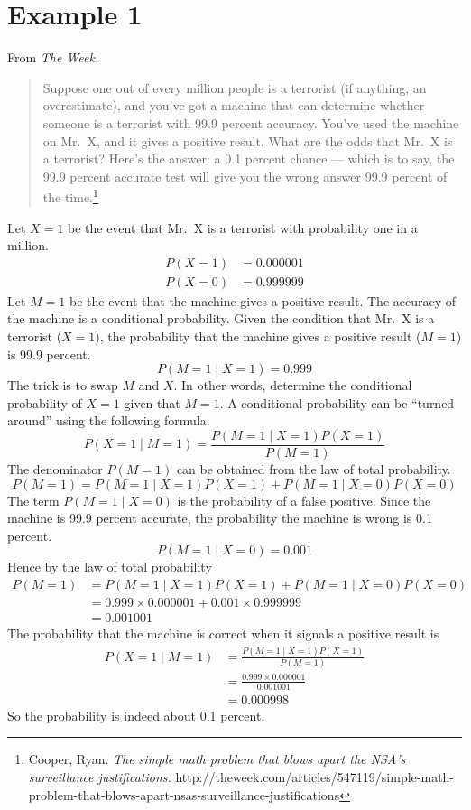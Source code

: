 \documentclass[12pt]{article}
\begin{document}
\section*{Example 1}

From {\it The Week.}
\begin{quote}
Suppose one out of every million people is a terrorist
(if anything, an overestimate), and you've got a machine
that can determine whether someone is a terrorist with 99.9 percent accuracy.
You've used the machine on Mr.~X, and it gives a positive result.
What are the odds that Mr.~X is a terrorist?
Here's the answer: a 0.1 percent chance --- which is to say,
the 99.9 percent accurate test will give you the wrong answer 99.9
percent of the time.\footnote{
Cooper, Ryan.
{\it The simple math problem that blows apart the NSA's surveillance justifications.}
http://theweek.com/articles/547119/simple-math-problem-that-blows-apart-nsas-surveillance-justifications}
\end{quote}

Let $X=1$ be the event that Mr.~X is a terrorist with probability
one in a million.
\begin{align*}
P(X{=}1)&=0.000001\\
P(X{=}0)&=0.999999
\end{align*}
Let $M=1$ be the event that the machine gives a positive result.
The accuracy of the machine is a conditional probability.
Given the condition that Mr.~X is a terrorist ($X=1$),
the probability that the machine gives a positive result ($M=1$)
is 99.9 percent.
\[
P(M{=}1\mid X{=}1)=0.999
\]
The trick is to swap $M$ and $X$.
In other words, determine the conditional probability of $X=1$ given that $M=1$.
A conditional probability can be ``turned around'' using the following formula.
\[
P(X{=}1\mid M{=1})=\frac{P(M{=}1\mid X{=}1)P(X{=}1)}{P(M{=}1)}
\]
The denominator $P(M{=}1)$ can be obtained from the law of total probability.
\[
P(M{=}1)=P(M{=}1\mid X{=}1)P(X{=}1)+P(M{=}1\mid X{=}0)P(X{=}0)
\]
The term $P(M{=}1\mid X{=}0)$ is the probability of a false positive.
Since the machine is 99.9 percent accurate,
the probability the machine is wrong is 0.1 percent.
\[
P(M{=}1\mid X{=}0)=0.001
\]
Hence by the law of total probability
\begin{align*}
P(M{=}1)
&=P(M{=}1\mid X{=}1)P(X{=}1)+P(M{=}1\mid X{=}0)P(X{=}0)\\
&=0.999\times0.000001+0.001\times0.999999\\
&=0.001001
\end{align*}
The probability that the machine is correct when it signals a positive result is
\begin{align*}
P(X{=}1\mid M{=1})
&=\frac{P(M{=}1\mid X{=}1)P(X{=}1)}{P(M{=}1)}\\
&=\frac{0.999\times0.000001}{0.001001}\\
&=0.000998
\end{align*}
So the probability is indeed about 0.1 percent.
\end{document}
